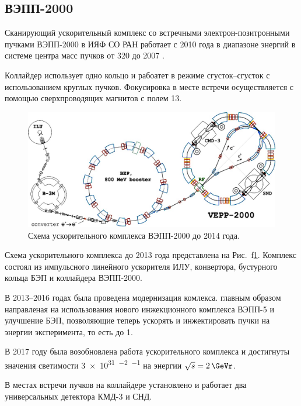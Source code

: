 \subsection{ВЭПП-2000}

Сканирующий ускорительный комплекс со встречными элек\-т\-рон-по\-зи\-т\-рон\-ны\-ми пучками ВЭПП-2000 в ИЯФ СО РАН работает с 2010 года в диапазоне энергий в системе центра масс пучков от \SI{320}{\MeVr} до \SI{2007}{\MeVr} \cite{Berkaev2012}.

Коллайдер использует одно кольцо и рабоатет в режиме сгусток--сгусток
с использованием круглых пучков.
Фокусировка в месте встречи осуществляется с помощью сверхпроводящих магнитов с полем \SI{13}{\teslaru}.

\begin{figure}[htbp]
    \centering
    \includegraphics[width=\textwidth]{img/vepp2knew.png}
    \caption{Схема ускорительного комплекса ВЭПП-2000 до 2014 года.}
    \label{fig:vepp2000}
\end{figure}

Схема ускорительного комплекса до 2013 года представлена на Рис.~f\ref{fig:vepp2000}.
Комплекс состоял из импульсного линейного ускорителя ИЛУ,
конвертора,
бустурного кольца БЭП
и коллайдера ВЭПП-2000.

В 2013--2016 годах была проведена модернизация комлекса.
главным образом направленая на использования нового инжекционного комплекса ВЭПП-5
и улучшение БЭП,
позволяющие теперь ускорять и инжектировать пучки на энергии эксперимента,
то есть до \SI{1}{\GeVr}.

В 2017 году была возобновлена работа ускорительного комплекса и достигнуты значения светимости \SI{3e31}{\cmr^{-2} \sr^{-1}} на энергии $\sqrt{s} = \SI{2}{\GeVr}$.

В местах встречи пучков на коллайдере установлено и работает два универсальных детектора КМД-3 и СНД.





